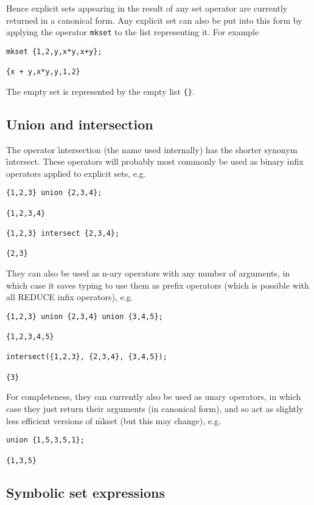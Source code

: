 Hence explicit sets appearing in the result of any set operator are
currently returned in a canonical form.  Any explicit set can also be
put into this form by applying the operator \texttt{mkset} to the list
representing it.  For example
\begin{verbatim}
mkset {1,2,y,x*y,x+y};

{x + y,x*y,y,1,2}
\end{verbatim}

The empty set is represented by the empty list \verb|{}|.


\subsection{Union and intersection}

The operator \f{intersection} (the name used internally) has the
shorter synonym \f{intersect}.  These operators will probably most
commonly be used as binary infix operators applied to explicit sets,
e.g.
\begin{verbatim}
{1,2,3} union {2,3,4};

{1,2,3,4}

{1,2,3} intersect {2,3,4};

{2,3}
\end{verbatim}
They can also be used as n-ary operators with any number of arguments,
in which case it saves typing to use them as prefix operators (which
is possible with all REDUCE infix operators), e.g.
\begin{verbatim}
{1,2,3} union {2,3,4} union {3,4,5};

{1,2,3,4,5}

intersect({1,2,3}, {2,3,4}, {3,4,5});

{3}
\end{verbatim}
For completeness, they can currently also be used as unary operators,
in which case they just return their arguments (in canonical form),
and so act as slightly less efficient versions of \f{mkset} (but
this may change), e.g.
\begin{verbatim}
union {1,5,3,5,1};

{1,3,5}
\end{verbatim}


\subsection{Symbolic set expressions}

